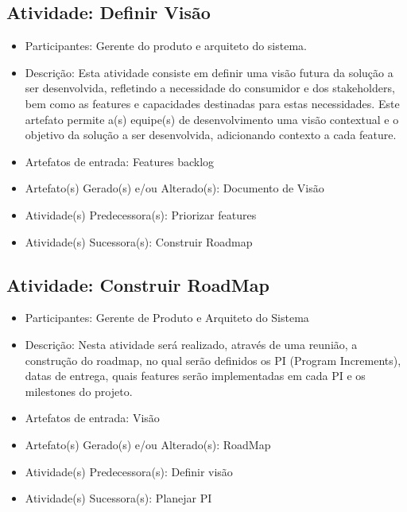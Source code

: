 \subsection{Atividade: Definir Visão}
\begin{itemize}
\item Participantes: Gerente do produto e arquiteto do sistema. 

\item Descrição: Esta atividade consiste em definir uma visão futura da solução a ser desenvolvida, refletindo a necessidade do consumidor e dos stakeholders, bem como as features e capacidades destinadas para estas necessidades.\cite{SAFe} Este artefato permite a(s) equipe(s) de desenvolvimento uma visão contextual e o objetivo da solução a ser desenvolvida, adicionando contexto a cada feature. 

\item Artefatos de entrada: Features backlog

\item Artefato(s) Gerado(s) e/ou Alterado(s): Documento de Visão

\item Atividade(s) Predecessora(s): Priorizar features
  
\item Atividade(s) Sucessora(s): Construir Roadmap
\end{itemize}


\subsection{Atividade: Construir RoadMap}
\begin{itemize}
\item Participantes: Gerente de Produto e Arquiteto do Sistema

\item Descrição: Nesta atividade será realizado, através de uma reunião, a construção do roadmap, no qual serão definidos os PI (Program Increments), datas de entrega, quais features serão implementadas em cada PI e os milestones do projeto.

\item Artefatos de entrada: Visão

\item Artefato(s) Gerado(s) e/ou Alterado(s): RoadMap

\item Atividade(s) Predecessora(s): Definir visão
  
\item Atividade(s) Sucessora(s): Planejar PI
\end{itemize}

